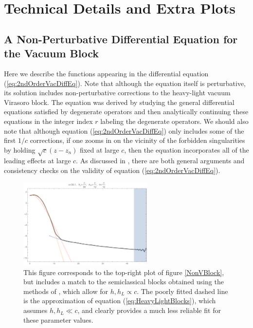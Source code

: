 \documentclass[12pt]{article}
\numberwithin{equation}{section}
\begin{document}
\section{Technical Details and Extra Plots}

\subsection{A Non-Perturbative Differential Equation for the Vacuum Block}
\label{app:DiffEqforVac}

Here we describe the functions appearing in the differential equation (\ref{eq:2ndOrderVacDiffEq}).  Note that although the equation itself is perturbative, its solution includes non-perturbative corrections to the heavy-light vacuum Virasoro block.
The equation was derived \cite{Fitzpatrick:2016ive} by studying the general  differential equations satisfied by degenerate operators and then analytically continuing these equations in the integer index $r$ labeling the degenerate operators.  We should also note that although equation (\ref{eq:2ndOrderVacDiffEq}) only includes some of the first $1/c$ corrections, if one zooms in on the vicinity of the forbidden singularities by holding $\sqrt{c} (z-z_n)$ fixed at large $c$, then the equation incorporates all of the leading effects at large $c$.  As discussed in \cite{Fitzpatrick:2016ive}, there are both general arguments and consistency checks on the validity of equation (\ref{eq:2ndOrderVacDiffEq}).  

\begin{figure}
\centering{}\includegraphics[width=0.6\textwidth]{NonVacSemiVSFull}
\caption{This figure corresponds to the top-right plot of figure \ref{NonVBlock}, but includes a match to the semiclassical blocks obtained using the methods of \cite{Fitzpatrick:2016mjq}, which allow for $h, h_L \propto c$.  The poorly fitted dashed line is the approximation of equation (\ref{eq:HeavyLightBlocks}), which assumes $h, h_L \ll c$, and clearly provides a much less reliable fit for these parameter values.}
\label{fig:NonVacSemiVSFull}
\end{figure}
\end{document}
